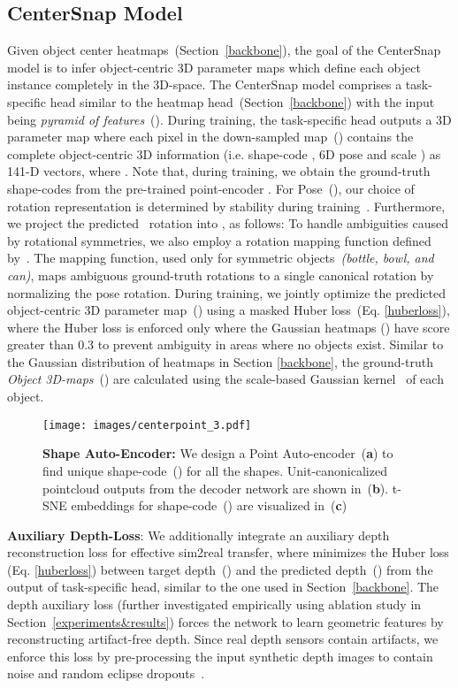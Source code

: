 \documentclass[letter, 10pt, conference]{ieeeconf}
\begin{document}
\subsection{CenterSnap Model}
\label{centermodel}
Given object center heatmaps~(Section~\ref{backbone}), the goal of the CenterSnap model is to infer object-centric 3D parameter maps which define each object instance completely in the 3D-space. The CenterSnap model comprises a task-specific head similar to the heatmap head~(Section~\ref{backbone}) with the input being \textit{pyramid of features}~(). During training, the task-specific head outputs a 3D parameter map    where each pixel in the down-sampled map~() contains the complete object-centric 3D information (i.e. shape-code , 6D pose  and scale ) as 141-D vectors, where . Note that, during training, we obtain the ground-truth shape-codes from the pre-trained point-encoder . For Pose~(), our choice of rotation representation    is determined by stability during training~\cite{zhou2019continuity}. Furthermore, we project the predicted~ rotation  into , as follows: 
To handle ambiguities caused by rotational symmetries, we also employ a rotation mapping function defined by~\cite{pitteri2019object}. The mapping function, used only for symmetric objects~\textit{(bottle, bowl, and can)}, maps ambiguous ground-truth rotations to a single canonical rotation by normalizing the pose rotation.
During training, we jointly optimize the predicted object-centric 3D parameter map~() using a masked Huber loss~(Eq. \ref{huberloss}), where the Huber loss is enforced only where the Gaussian heatmaps () have score greater than 0.3 to prevent ambiguity in areas where no objects exist. Similar to the Gaussian distribution of heatmaps in Section \ref{backbone}, the ground-truth \textit{Object 3D-maps}~() are calculated using the scale-based Gaussian kernel~ of each object. 


\begin{figure}[t!]
\centering
\texttt{[image: images/centerpoint\_3.pdf]}
\centering
  \caption{
  \textbf{Shape Auto-Encoder:} We design a Point Auto-encoder~(\textbf{a}) to find unique shape-code~() for all the shapes. Unit-canonicalized pointcloud outputs from the decoder network are shown in~(\textbf{b}). t-SNE embeddings for shape-code~() are visualized in~(\textbf{c})
  }
  \label{auto-encoder}
\end{figure}
\textbf{Auxiliary Depth-Loss}: We additionally integrate an auxiliary depth reconstruction loss  for effective sim2real transfer, where  minimizes the Huber loss (Eq. \ref{huberloss}) between target depth~() and the predicted depth~() from the output of task-specific head, similar to the one used in Section~\ref{backbone}. The depth auxiliary loss (further investigated empirically using ablation study in Section~\ref{experiments&results}) forces the network to learn geometric features by reconstructing artifact-free depth. Since real depth sensors contain artifacts, we enforce this loss by pre-processing the input synthetic depth images to contain noise and random eclipse dropouts~\cite{laskey2021simnet}.
\end{document}
